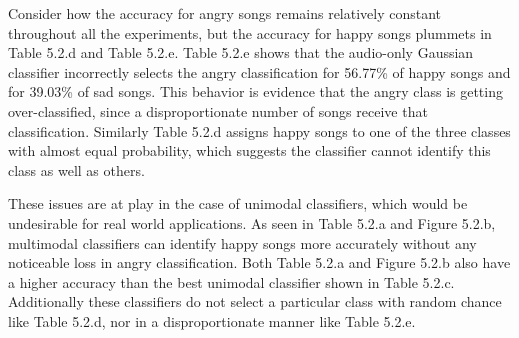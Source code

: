  Consider how  the accuracy for angry songs remains relatively constant throughout all the experiments,
but the accuracy for happy songs plummets in Table 5.2.d and Table 5.2.e. Table 5.2.e shows that the audio-only Gaussian 
classifier incorrectly selects the angry classification for 56.77\% of happy songs and for 39.03\% of sad songs. 
 This behavior is evidence that the angry class is getting over-classified, since a disproportionate number of 
 songs receive that classification.  Similarly Table 5.2.d assigns happy songs
 to one of the three classes with almost equal probability, which suggests the classifier cannot identify this class as well as
 others. 
 
These  issues are at play in the case of unimodal classifiers, which would be undesirable for
real world applications. As seen in Table 5.2.a and Figure 5.2.b,  
multimodal classifiers can identify happy songs more accurately without any noticeable loss in angry classification. Both 
 Table 5.2.a and Figure 5.2.b also have a higher accuracy than the best unimodal classifier shown in Table 5.2.c.
Additionally these classifiers do not select a particular class with random chance like Table 5.2.d, nor in a disproportionate manner like Table 5.2.e.




